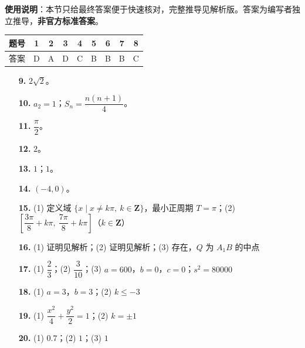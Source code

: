 
\begin{gknotice}
\textbf{使用说明}：本节只给最终答案便于快速核对，完整推导见解析版。答案为编写者独立推导，\textbf{非官方标准答案}。
\end{gknotice}

\begin{center}\begin{tabular}{ccccccccc}
\toprule
题号 & 1 & 2 & 3 & 4 & 5 & 6 & 7 & 8 \\
\midrule
答案 & D & A & D & C & B & B & B & C \\
\bottomrule
\end{tabular}\end{center}

\begin{itemize}[leftmargin=2.6em]
  \item[\textbf{9.}] $2\sqrt2$。
  \item[\textbf{10.}] $a_2=1$；$S_n=\dfrac{n(n+1)}4$。
  \item[\textbf{11.}] $\dfrac\pi2$。
  \item[\textbf{12.}] $2$。
  \item[\textbf{13.}] $1$；$1$。
  \item[\textbf{14.}] $(-4,0)$。
\end{itemize}

\begin{itemize}[leftmargin=2.6em]
  \item[\textbf{15.}] (1) 定义域 $\{x\mid x\neq k\pi,\ k\in\mathbf Z\}$，最小正周期 $T=\pi$；(2) $\left[\dfrac{3\pi}8+k\pi,\ \dfrac{7\pi}8+k\pi\right]$（$k\in\mathbf Z$）
  \item[\textbf{16.}] (1) 证明见解析；(2) 证明见解析；(3) 存在，$Q$ 为 $A_1B$ 的中点
  \item[\textbf{17.}] (1) $\dfrac23$；(2) $\dfrac3{10}$；(3) $a=600$，$b=0$，$c=0$；$s^2=80000$
  \item[\textbf{18.}] (1) $a=3$，$b=3$；(2) $k\leqslant-3$
  \item[\textbf{19.}] (1) $\dfrac{x^2}4+\dfrac{y^2}2=1$；(2) $k=\pm1$
  \item[\textbf{20.}] (1) $0.7$；(2) $1$；(3) $1$
\end{itemize}
